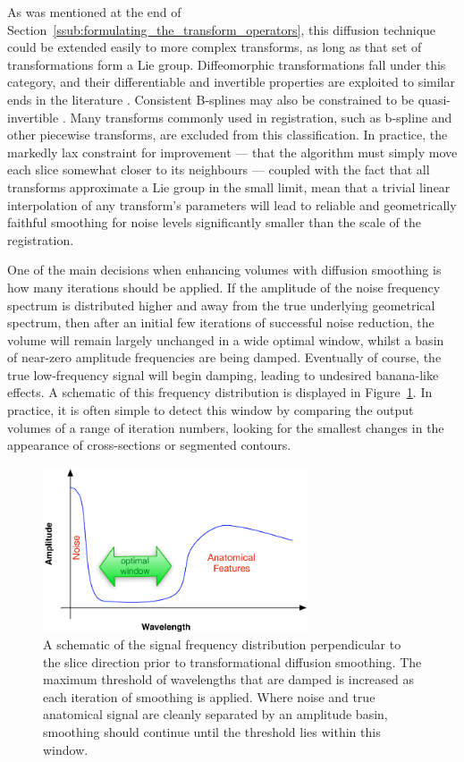   As was mentioned at the end of Section~\ref{ssub:formulating_the_transform_operators}, this diffusion technique could be extended easily to more complex transforms, as long as that set of transformations form a Lie group. Diffeomorphic transformations fall under this category, and their differentiable and invertible properties are exploited to similar ends in the literature \cite{Avants2006}. Consistent B-splines may also be constrained to be quasi-invertible \cite{Arganda-Carreras2010}. Many transforms commonly used in registration, such as b-spline and other piecewise transforms, are excluded from this classification. In practice, the markedly lax constraint for improvement --- that the algorithm must simply  move each slice somewhat closer to its neighbours --- coupled with the fact that all transforms approximate a Lie group in the small limit, mean that a trivial linear interpolation of any transform's parameters will lead to reliable and geometrically faithful smoothing for noise levels significantly smaller than the scale of the registration.
    
  One of the main decisions when enhancing volumes with diffusion smoothing is how many iterations should be applied. If the amplitude of the noise frequency spectrum is distributed higher and away from the true underlying geometrical spectrum, then after an initial few iterations of successful noise reduction, the volume will remain largely unchanged in a wide optimal window, whilst a basin of near-zero amplitude frequencies are being damped. Eventually of course, the true low-frequency signal will begin damping, leading to undesired banana-like effects. A schematic of this frequency distribution is displayed in Figure~\ref{fig:noise_spectrum_schematic}. In practice, it is often simple to detect this window by comparing the output volumes of a range of iteration numbers, looking for the smallest changes in the appearance of cross-sections or segmented contours.
  
  \begin{figure}[htbp]
    \centering
    \includegraphics[width=0.7\textwidth]{Ch6/Figs/noise_spectrum_schematic}
    \caption{A schematic of the signal frequency distribution perpendicular to the slice direction prior to transformational diffusion smoothing. The maximum threshold of wavelengths that are damped is increased as each iteration of smoothing is applied. Where noise and true anatomical signal are cleanly separated by an amplitude basin, smoothing should continue until the threshold lies within this window.}
    \label{fig:noise_spectrum_schematic}
  \end{figure}
  
